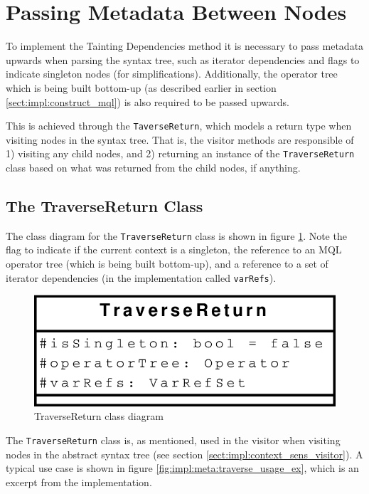 \section{Passing Metadata Between Nodes}
To implement the Tainting Dependencies method it is necessary to pass
metadata upwards when parsing the syntax tree, such as
iterator dependencies and flags to indicate singleton nodes (for simplifications). Additionally, the
operator tree which is being built bottom-up (as described earlier in section
\ref{sect:impl:construct_mql}) is also required to be passed upwards. 

This is achieved through the \texttt{TaverseReturn}, which models a return type
when visiting nodes in the syntax tree. That is, the visitor methods are
responsible of 1) visiting any child nodes, and 2) returning an instance of the
\texttt{TraverseReturn} class based on what was returned from the child nodes,
if anything.

\subsection{The TraverseReturn Class}
The class diagram for the \texttt{TraverseReturn} class is shown in figure
\ref{fig:impl:meta:traverse_uml}. Note the flag to indicate if the current
context is a singleton, the reference to an MQL operator tree (which is being
built bottom-up), and a reference to a set of iterator dependencies (in the implementation called
\texttt{varRefs}).

\begin{figure}[!htp]
\begin{center}
  \includegraphics[scale=0.5]{diagrams/traversereturn_uml}
  \caption{TraverseReturn class diagram}
  \label{fig:impl:meta:traverse_uml}
\end{center}
\end{figure}

The \texttt{TraverseReturn} class is, as mentioned, used in the visitor when
visiting nodes in the abstract syntax tree (see section
\ref{sect:impl:context_sens_visitor}). A typical use case is shown in figure
\ref{fig:impl:meta:traverse_usage_ex}, which is an excerpt from the
implementation.

